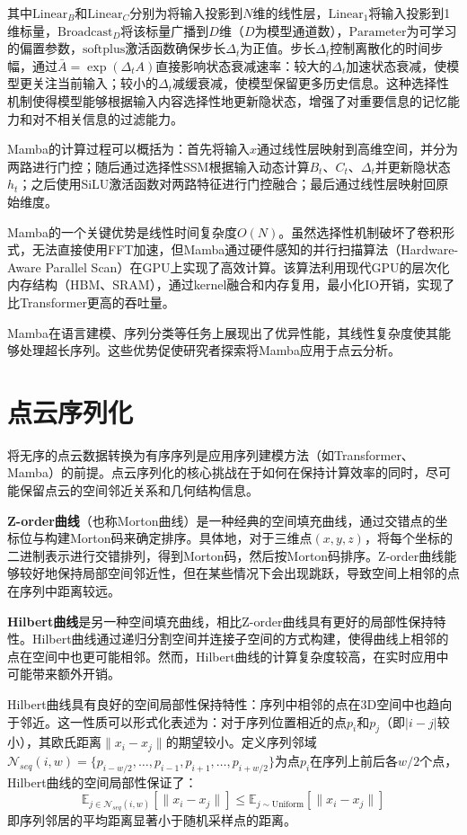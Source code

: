\documentclass[12pt,a4paper,openany,oneside]{ctexbook}
\theoremstyle{definition}
\theoremstyle{remark}
\begin{document}
其中$\text{Linear}_B$和$\text{Linear}_C$分别为将输入投影到$N$维的线性层，$\text{Linear}_1$将输入投影到1维标量，$\text{Broadcast}_D$将该标量广播到$D$维（$D$为模型通道数），$\text{Parameter}$为可学习的偏置参数，$\text{softplus}$激活函数确保步长$\Delta_t$为正值。步长$\Delta_t$控制离散化的时间步幅，通过$\bar{A} = \exp(\Delta_t A)$直接影响状态衰减速率：较大的$\Delta_t$加速状态衰减，使模型更关注当前输入；较小的$\Delta_t$减缓衰减，使模型保留更多历史信息。这种选择性机制使得模型能够根据输入内容选择性地更新隐状态，增强了对重要信息的记忆能力和对不相关信息的过滤能力。

Mamba的计算过程可以概括为：首先将输入$x$通过线性层映射到高维空间，并分为两路进行门控；随后通过选择性SSM根据输入动态计算$B_t$、$C_t$、$\Delta_t$并更新隐状态$h_t$；之后使用SiLU激活函数对两路特征进行门控融合；最后通过线性层映射回原始维度。

Mamba的一个关键优势是线性时间复杂度$O(N)$。虽然选择性机制破坏了卷积形式，无法直接使用FFT加速，但Mamba通过硬件感知的并行扫描算法（Hardware-Aware Parallel Scan）在GPU上实现了高效计算。该算法利用现代GPU的层次化内存结构（HBM、SRAM），通过kernel融合和内存复用，最小化IO开销，实现了比Transformer更高的吞吐量。

Mamba在语言建模、序列分类等任务上展现出了优异性能，其线性复杂度使其能够处理超长序列。这些优势促使研究者探索将Mamba应用于点云分析。

\section{点云序列化}

将无序的点云数据转换为有序序列是应用序列建模方法（如Transformer、Mamba）的前提。点云序列化的核心挑战在于如何在保持计算效率的同时，尽可能保留点云的空间邻近关系和几何结构信息。

\textbf{Z-order曲线}（也称Morton曲线）是一种经典的空间填充曲线，通过交错点的坐标位与构建Morton码来确定排序。具体地，对于三维点$(x, y, z)$，将每个坐标的二进制表示进行交错排列，得到Morton码，然后按Morton码排序。Z-order曲线能够较好地保持局部空间邻近性，但在某些情况下会出现跳跃，导致空间上相邻的点在序列中距离较远。

\textbf{Hilbert曲线}是另一种空间填充曲线，相比Z-order曲线具有更好的局部性保持特性。Hilbert曲线通过递归分割空间并连接子空间的方式构建，使得曲线上相邻的点在空间中也更可能相邻。然而，Hilbert曲线的计算复杂度较高，在实时应用中可能带来额外开销。

Hilbert曲线具有良好的空间局部性保持特性\cite{lawder2000using}：序列中相邻的点在3D空间中也趋向于邻近。这一性质可以形式化表述为：对于序列位置相近的点$p_i$和$p_j$（即$|i-j|$较小），其欧氏距离$\|x_i - x_j\|$的期望较小。定义序列邻域$\mathcal{N}_{seq}(i, w) = \{p_{i-w/2}, \ldots, p_{i-1}, p_{i+1}, \ldots, p_{i+w/2}\}$为点$p_i$在序列上前后各$w/2$个点，Hilbert曲线的空间局部性保证了：
\begin{equation}
\mathbb{E}_{j \in \mathcal{N}_{seq}(i, w)}[\|x_i - x_j\|] \leq \mathbb{E}_{j \sim \text{Uniform}}[\|x_i - x_j\|]
\end{equation}
即序列邻居的平均距离显著小于随机采样点的距离。
\end{document}
